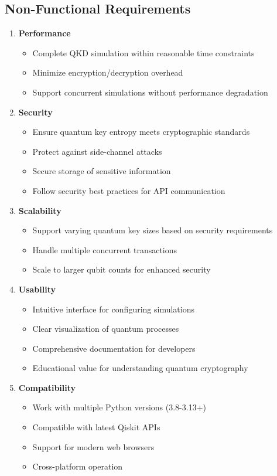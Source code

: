 \documentclass[conference]{IEEEtran}
\begin{document}
\subsection{Non-Functional Requirements}
\begin{enumerate}
    \item \textbf{Performance}
    \begin{itemize}
        \item Complete QKD simulation within reasonable time constraints
        \item Minimize encryption/decryption overhead
        \item Support concurrent simulations without performance degradation
    \end{itemize}
    
    \item \textbf{Security}
    \begin{itemize}
        \item Ensure quantum key entropy meets cryptographic standards
        \item Protect against side-channel attacks
        \item Secure storage of sensitive information
        \item Follow security best practices for API communication
    \end{itemize}
    
    \item \textbf{Scalability}
    \begin{itemize}
        \item Support varying quantum key sizes based on security requirements
        \item Handle multiple concurrent transactions
        \item Scale to larger qubit counts for enhanced security
    \end{itemize}
    
    \item \textbf{Usability}
    \begin{itemize}
        \item Intuitive interface for configuring simulations
        \item Clear visualization of quantum processes
        \item Comprehensive documentation for developers
        \item Educational value for understanding quantum cryptography
    \end{itemize}
    
    \item \textbf{Compatibility}
    \begin{itemize}
        \item Work with multiple Python versions (3.8-3.13+)
        \item Compatible with latest Qiskit APIs
        \item Support for modern web browsers
        \item Cross-platform operation
    \end{itemize}
\end{enumerate}
\end{document}
